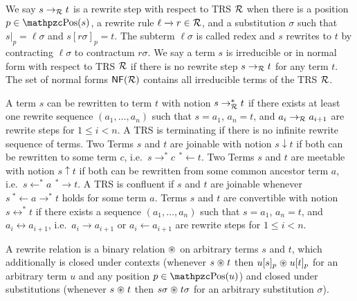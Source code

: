 %
\begin{definition}
	We say $s\rightarrow_{\mathcal R} t$ is a 
	{\myem rewrite step} 
	 with respect to TRS ${\mathcal R}$ 
	when there is a position $p \in \pos(s)$, 
	a rewrite rule $\ell\xrightarrow[{}]{} r\in{\mathcal R}$, 
	and a substitution $\sigma$ such that
	$s|_p=\ell\sigma$ and $s[r\sigma]_p = t$.
		The subterm $\ell\sigma$ is called {\myem redex} and
	$s$ rewrites to $t$ by {\myem contracting} $\ell\sigma$ to {\myem contractum} $r\sigma$.
	We say a term $s$ is {\myem irreducible} or in {\myem normal form} with respect to TRS ${\mathcal R}$ if there is no rewrite step $s\rightarrow_{\mathcal R} t$ for any term $t$. 
	The set of normal forms $\mathsf{NF}({\mathcal R})$ contains all irreducible terms of the TRS ${\mathcal R}$.
	\end{definition}
%
%
\begin{definition}
	A term $s$ can be rewritten to term $t$ with notion $s\rightarrow^*_{\mathcal R} t$ 
	if there exists at least one {\myem rewrite sequence} $(a_1,\ldots ,a_n)$ such that
	$s=a_1$, $a_n=t$, and $a_i\rightarrow_{\mathcal R} a_{i+1}$ are rewrite steps for $1\leq i<n$.
	A TRS is {\myem terminating} if there is no infinite rewrite sequence of terms.
	Two Terms $s$ and $t$ are {\myem joinable} with notion $s\downarrow t$ 
	if both can be rewritten to some term $c$, i.e.~$s \rightarrow^*c\ \, ^*\!\!\leftarrow t$.
%	
	Two Terms $s$ and $t$ are {\myem meetable} with notion $s\uparrow t$ 
	if both can be rewritten from some common ancestor term $a$, i.e.~$s \leftarrow^*a\ \, ^*\!\!\rightarrow t$.
%
	A TRS is {\myem confluent } if $s$ and $t$ are joinable whenever $s\ ^*\!\!\leftarrow a \rightarrow^* t$ holds for some term $a$.
	Terms $s$ and $t$ are {\myem convertible} with notion $s\leftrightarrow^* t$ 
	if there exists a sequence $(a_1,\ldots ,a_n)$ such that
	$s=a_1$, $a_n=t$, and $a_i\leftrightarrow a_{i+1}$, i.e.~$a_i\rightarrow a_{i+1}$ or $a_i\leftarrow a_{i+1}$ are rewrite steps for $1\leq i<n$.
\end{definition}
%
\begin{definition}\label{def:closed-under}
	A {\myem rewrite relation} is a binary relation 
	$\mathrel{\circledast}$ on arbitrary terms $s$ and $t$, 
	which additionally is {\myem closed under contexts} 
	(whenever $s\mathrel{\circledast} t$ then $u[s]_p\mathrel{\circledast} u[t]_p$ 
	for an arbitrary term $u$ and any position $p\in\pos(u)$)
	and {\myem closed under substitutions} 
	(whenever $s\mathrel{\circledast} t$ then $s\sigma\mathrel{\circledast} t\sigma$
	for an arbitrary substitution $\sigma$).
\end{definition}
